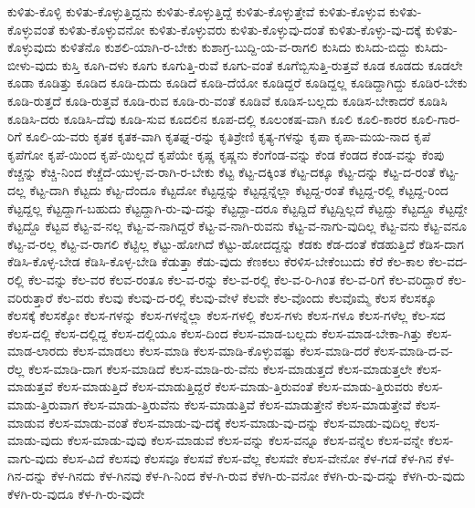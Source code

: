 {ಕುಳಿತು-ಕೊಳ್ಳಿ
ಕುಳಿತು-ಕೊಳ್ಳುತ್ತಿದ್ದನು
ಕುಳಿತು-ಕೊಳ್ಳುತ್ತಿದ್ದೆ
ಕುಳಿತು-ಕೊಳ್ಳುತ್ತೇವೆ
ಕುಳಿತು-ಕೊಳ್ಳುವ
ಕುಳಿತು-ಕೊಳ್ಳುವಂತೆ
ಕುಳಿತು-ಕೊಳ್ಳುವನೋ
ಕುಳಿತು-ಕೊಳ್ಳುವರು
ಕುಳಿತು-ಕೊಳ್ಳುವು-ದಂತೆ
ಕುಳಿತು-ಕೊಳ್ಳು-ವು-ದಕ್ಕೆ
ಕುಳಿತು-ಕೊಳ್ಳುವುದು
ಕುಳಿತೆನೊ
ಕುಶಲಿ-ಯಾಗಿ-ರ-ಬೇಕು
ಕುಶಾಗ್ರ-ಬುದ್ದಿ-ಯ-ವ-ರಾಗಲಿ
ಕುಸಿದು
ಕುಸಿದು-ಬಿದ್ದು
ಕುಸಿದು-ಬೀಳು-ವುದು
ಕುಸ್ತಿ
ಕೂಗಿ-ದಳು
ಕೂಗು
ಕೂಗುತ್ತಿ-ರುವೆ
ಕೂಗು-ವಂತೆ
ಕೂಗೆಬ್ಬಿಸುತ್ತಿ-ರುತ್ತವೆ
ಕೂಡ
ಕೂಡದು
ಕೂಡಲೇ
ಕೂಡಾ
ಕೂಡಿತ್ತು
ಕೂಡಿದ
ಕೂಡಿ-ದುದು
ಕೂಡಿದೆ
ಕೂಡಿ-ದೆಯೋ
ಕೂಡಿದ್ದರೆ
ಕೂಡಿದ್ದಲ್ಲ
ಕೂಡಿದ್ದಾಗಿದ್ದು
ಕೂಡಿರ-ಬೇಕು
ಕೂಡಿ-ರುತ್ತದೆ
ಕೂಡಿ-ರುತ್ತವೆ
ಕೂಡಿ-ರುವ
ಕೂಡಿ-ರು-ವಂತೆ
ಕೂಡಿವೆ
ಕೂಡಿಸ-ಬಲ್ಲದು
ಕೂಡಿಸ-ಬೇಕಾದರೆ
ಕೂಡಿಸಿ
ಕೂಡಿಸಿ-ದರು
ಕೂಡಿಸಿ-ದೆವು
ಕೂಡಿ-ಸುವ
ಕೂದಲಿನ
ಕೂಪ-ದಲ್ಲಿ
ಕೂಲಂಕಷ-ವಾಗಿ
ಕೂಲಿ
ಕೂಲಿ-ಕಾರರ
ಕೂಲಿ-ಗಾರ-ರಿಗೆ
ಕೂಲಿ-ಯ-ವರು
ಕೃತಕ
ಕೃತಕ-ವಾಗಿ
ಕೃತಘ್ನ-ರನ್ನು
ಕೃತಿಶ್ರೇಣಿ
ಕೃತ್ಯ-ಗಳನ್ನು
ಕೃಪಾ
ಕೃಪಾ-ಮಯ-ನಾದ
ಕೃಪೆ
ಕೃಪೆಗೋ
ಕೃಪೆ-ಯಿಂದ
ಕೃಪೆ-ಯಿಲ್ಲದೆ
ಕೃಪೆಯೇ
ಕೃಷ್ಣ
ಕೃಷ್ಣನು
ಕೆಂಗೆಂಡ-ವನ್ನು
ಕೆಂಡ
ಕೆಂಡದ
ಕೆಂಡ-ವನ್ನು
ಕೆಂಪು
ಕೆಚ್ಚನ್ನು
ಕೆಚ್ಚಿ-ನಿಂದ
ಕೆಚ್ಚೆದೆ-ಯುಳ್ಳ-ವ-ರಾಗಿ-ರ-ಬೇಕು
ಕೆಟ್ಟ
ಕೆಟ್ಟ-ದಕ್ಕಿಂತ
ಕೆಟ್ಟ-ದಕ್ಕೂ
ಕೆಟ್ಟ-ದನ್ನು
ಕೆಟ್ಟ-ದ-ರಂತೆ
ಕೆಟ್ಟ-ದಲ್ಲ
ಕೆಟ್ಟ-ದಾಗಿ
ಕೆಟ್ಟದು
ಕೆಟ್ಟ-ದೆಂದೂ
ಕೆಟ್ಟದೋ
ಕೆಟ್ಟದ್ದನ್ನು
ಕೆಟ್ಟದ್ದನ್ನೆಲ್ಲಾ
ಕೆಟ್ಟದ್ದ-ರಂತೆ
ಕೆಟ್ಟದ್ದ-ರಲ್ಲಿ
ಕೆಟ್ಟದ್ದ-ರಿಂದ
ಕೆಟ್ಟದ್ದಲ್ಲ
ಕೆಟ್ಟದ್ದಾಗ-ಬಹುದು
ಕೆಟ್ಟದ್ದಾಗಿ-ರು-ವು-ದನ್ನು
ಕೆಟ್ಟದ್ದಾ-ದರೂ
ಕೆಟ್ಟದ್ದಿದೆ
ಕೆಟ್ಟದ್ದಿಲ್ಲದೆ
ಕೆಟ್ಟದ್ದು
ಕೆಟ್ಟದ್ದೂ
ಕೆಟ್ಟದ್ದೇ
ಕೆಟ್ಟದ್ದೊ
ಕೆಟ್ಟವ
ಕೆಟ್ಟ-ವ-ನಲ್ಲ
ಕೆಟ್ಟ-ವ-ನಾಗಿದ್ದರೆ
ಕೆಟ್ಟ-ವ-ನಾಗಿ-ರುವನು
ಕೆಟ್ಟ-ವ-ನಾಗು-ವುದಿಲ್ಲ
ಕೆಟ್ಟ-ವನು
ಕೆಟ್ಟ-ವನೂ
ಕೆಟ್ಟ-ವ-ರಲ್ಲ
ಕೆಟ್ಟ-ವ-ರಾಗಲಿ
ಕೆಟ್ಟಿಲ್ಲ
ಕೆಟ್ಟು-ಹೋಗಿದೆ
ಕೆಟ್ಟು-ಹೋದದ್ದನ್ನು
ಕೆಡಕು
ಕೆಡ-ದಂತೆ
ಕೆಡಹುತ್ತಿದೆ
ಕೆಡಿಸ-ದಾಗ
ಕೆಡಿಸಿ-ಕೊಳ್ಳ-ಬೇಡ
ಕೆಡಿಸಿ-ಕೊಳ್ಳ-ಬೇಡಿ
ಕೆಡುತ್ತಾ
ಕೆಡು-ವುದು
ಕೆಣಕಲು
ಕೆರಳಿಸ-ಬೇಕೆಂಬುದು
ಕೆರೆ
ಕೆಲ-ಕಾಲ
ಕೆಲ-ವದ-ರಲ್ಲಿ
ಕೆಲ-ವನ್ನು
ಕೆಲ-ವರ
ಕೆಲವ-ರಂತೂ
ಕೆಲ-ವ-ರನ್ನು
ಕೆಲ-ವ-ರಲ್ಲಿ
ಕೆಲ-ವ-ರಿ-ಗಿಂತ
ಕೆಲ-ವ-ರಿಗೆ
ಕೆಲ-ವರಿದ್ದಾರೆ
ಕೆಲ-ವರಿರುತ್ತಾರೆ
ಕೆಲ-ವರು
ಕೆಲವು
ಕೆಲವು-ದ-ರಲ್ಲಿ
ಕೆಲವು-ವೇಳೆ
ಕೆಲವೇ
ಕೆಲ-ವೊಂದು
ಕೆಲವೊಮ್ಮೆ
ಕೆಲಸ
ಕೆಲಸಕ್ಕೂ
ಕೆಲಸಕ್ಕೆ
ಕೆಲಸಕ್ಕೋ
ಕೆಲಸ-ಗಳನ್ನು
ಕೆಲಸ-ಗಳನ್ನೆಲ್ಲಾ
ಕೆಲಸ-ಗಳಲ್ಲಿ
ಕೆಲಸ-ಗಳು
ಕೆಲಸ-ಗಳೂ
ಕೆಲಸ-ಗಳೆಲ್ಲ
ಕೆಲ-ಸದ
ಕೆಲಸ-ದಲ್ಲಿ
ಕೆಲಸ-ದಲ್ಲಿದ್ದ
ಕೆಲಸ-ದಲ್ಲಿಯೂ
ಕೆಲಸ-ದಿಂದ
ಕೆಲಸ-ಮಾಡ-ಬಲ್ಲದು
ಕೆಲಸ-ಮಾಡ-ಬೇಕಾ-ಗಿತ್ತು
ಕೆಲಸ-ಮಾಡ-ಲಾರದು
ಕೆಲಸ-ಮಾಡಲು
ಕೆಲಸ-ಮಾಡಿ
ಕೆಲಸ-ಮಾಡಿ-ಕೊಳ್ಳುವಷ್ಟು
ಕೆಲಸ-ಮಾಡಿ-ದರೆ
ಕೆಲಸ-ಮಾಡಿ-ದ-ವ-ರೆಲ್ಲ
ಕೆಲಸ-ಮಾಡಿ-ದಾಗ
ಕೆಲಸ-ಮಾಡಿದೆ
ಕೆಲಸ-ಮಾಡಿ-ರು-ವೆನು
ಕೆಲಸ-ಮಾಡುತ್ತದೆ
ಕೆಲಸ-ಮಾಡುತ್ತಲೇ
ಕೆಲಸ-ಮಾಡುತ್ತವೆ
ಕೆಲಸ-ಮಾಡುತ್ತಿದೆ
ಕೆಲಸ-ಮಾಡುತ್ತಿದ್ದರೆ
ಕೆಲಸ-ಮಾಡು-ತ್ತಿರುವಂತೆ
ಕೆಲಸ-ಮಾಡು-ತ್ತಿರುವರು
ಕೆಲಸ-ಮಾಡು-ತ್ತಿರುವಾಗ
ಕೆಲಸ-ಮಾಡು-ತ್ತಿರುವೆನು
ಕೆಲಸ-ಮಾಡುತ್ತಿವೆ
ಕೆಲಸ-ಮಾಡುತ್ತೇನೆ
ಕೆಲಸ-ಮಾಡುತ್ತೇವೆ
ಕೆಲಸ-ಮಾಡುವ
ಕೆಲಸ-ಮಾಡು-ವಂತೆ
ಕೆಲಸ-ಮಾಡು-ವು-ದಕ್ಕೆ
ಕೆಲಸ-ಮಾಡು-ವು-ದನ್ನು
ಕೆಲಸ-ಮಾಡು-ವುದಿಲ್ಲ
ಕೆಲಸ-ಮಾಡು-ವುದು
ಕೆಲಸ-ಮಾಡು-ವುವು
ಕೆಲಸ-ಮಾಡುವೆ
ಕೆಲಸ-ವನ್ನು
ಕೆಲಸ-ವನ್ನೂ
ಕೆಲಸ-ವನ್ನೆಲ
ಕೆಲಸ-ವನ್ನೇ
ಕೆಲಸ-ವಾಗು-ವುದು
ಕೆಲಸ-ವಿದೆ
ಕೆಲಸವು
ಕೆಲಸವೂ
ಕೆಲಸವೆ
ಕೆಲಸ-ವೆಲ್ಲ
ಕೆಲಸವೇ
ಕೆಲಸ-ವೇನೋ
ಕೆಳ-ಗಡೆ
ಕೆಳ-ಗಿನ
ಕೆಳ-ಗಿನ-ದನ್ನು
ಕೆಳ-ಗಿನದು
ಕೆಳ-ಗಿನವು
ಕೆಳ-ಗಿ-ನಿಂದ
ಕೆಳ-ಗಿ-ರುವ
ಕೆಳಗಿ-ರು-ವನೋ
ಕೆಳಗಿ-ರು-ವು-ದನ್ನು
ಕೆಳಗಿ-ರು-ವುದು
ಕೆಳಗಿ-ರು-ವುದೂ
ಕೆಳ-ಗಿ-ರು-ವುದೇ
}
